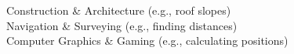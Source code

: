 \documentclass[preview]{standalone}
\begin{document}
Construction \& Architecture (e.g., roof slopes)\\Navigation \& Surveying (e.g., finding distances)\\Computer Graphics \& Gaming (e.g., calculating positions)\\
\end{document}
